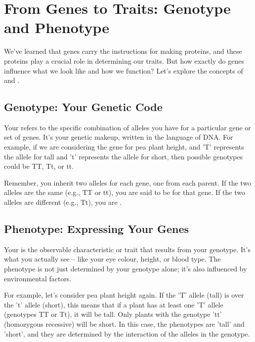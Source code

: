 \section{From Genes to Traits: Genotype and Phenotype}

We've learned that genes carry the instructions for making proteins, and these proteins play a crucial role in determining our traits.  But how exactly do genes influence what we look like and how we function?  Let's explore the concepts of  and .

\subsection{Genotype: Your Genetic Code}

Your  refers to the specific combination of alleles you have for a particular gene or set of genes. It's your genetic makeup, written in the language of DNA.  For example, if we are considering the gene for pea plant height, and 'T' represents the allele for tall and 't' represents the allele for short, then possible genotypes could be TT, Tt, or tt.

Remember, you inherit two alleles for each gene, one from each parent.  If the two alleles are the same (e.g., TT or tt), you are said to be  for that gene. If the two alleles are different (e.g., Tt), you are .

\subsection{Phenotype: Expressing Your Genes}

Your  is the observable characteristic or trait that results from your genotype. It's what you actually see – like your eye colour, height, or blood type.  The phenotype is not just determined by your genotype alone; it's also influenced by environmental factors.

\begin{marginnote}
\end{marginnote}

For example, let's consider pea plant height again.  If the 'T' allele (tall) is  over the 't' allele (short), this means that if a plant has at least one 'T' allele (genotypes TT or Tt), it will be tall.  Only plants with the genotype 'tt' (homozygous recessive) will be short.  In this case, the phenotypes are 'tall' and 'short', and they are determined by the interaction of the alleles in the genotype.

